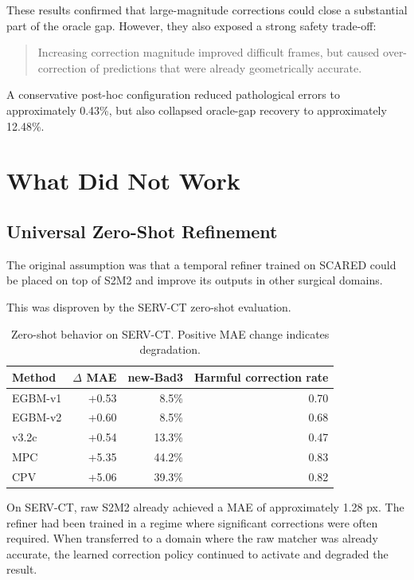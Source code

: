 \documentclass[11pt,a4paper]{article}
\newcommand{\smodel}{S2M2}
\begin{document}
These results confirmed that large-magnitude corrections could close a substantial
part of the oracle gap. However, they also exposed a strong safety trade-off:

\begin{quote}
Increasing correction magnitude improved difficult frames, but caused
over-correction of predictions that were already geometrically accurate.
\end{quote}

A conservative post-hoc configuration reduced pathological errors to approximately
0.43\%, but also collapsed oracle-gap recovery to approximately 12.48\%.

\section{What Did Not Work}

\subsection{Universal Zero-Shot Refinement}

The original assumption was that a temporal refiner trained on SCARED could be
placed on top of \smodel{} and improve its outputs in other surgical domains.

This was disproven by the SERV-CT zero-shot evaluation.

\begin{table}[h]
\centering
\caption{Zero-shot behavior on SERV-CT. Positive MAE change indicates degradation.}
\small
\begin{tabularx}{\textwidth}{
    >{\raggedright\arraybackslash}X
    r
    r
    r
}
\toprule
\textbf{Method}
& $\Delta$ \textbf{MAE}
& \textbf{new-Bad3}
& \textbf{Harmful correction rate} \\
\midrule
EGBM-v1
& +0.53
& 8.5\%
& 0.70 \\

EGBM-v2
& +0.60
& 8.5\%
& 0.68 \\

v3.2c
& +0.54
& 13.3\%
& 0.47 \\

MPC
& +5.35
& 44.2\%
& 0.83 \\

CPV
& +5.06
& 39.3\%
& 0.82 \\
\bottomrule
\end{tabularx}
\end{table}

On SERV-CT, raw \smodel{} already achieved a MAE of approximately 1.28 px.
The refiner had been trained in a regime where significant corrections were often
required. When transferred to a domain where the raw matcher was already accurate,
the learned correction policy continued to activate and degraded the result.
\end{document}
